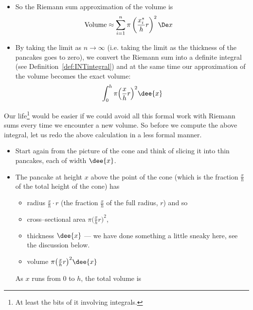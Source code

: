\begin{eg}[Cone]
\begin{itemize}
\item So the Riemann sum approximation of the volume is
\begin{align*}
  \text{Volume} &\approx \sum_{i=1}^n  \pi \left( \frac{x_i^*}{h}r\right)^2 \De x
\end{align*}
\item By taking the limit as $n \to \infty$ (i.e. taking the limit as the thickness of
the pancakes goes to zero), we convert the Riemann sum into a definite integral (see
Definition~\ref{def:INTintegral}) and at the same time our approximation of the volume
becomes the exact volume:
\begin{align*}
\int_0^h \pi \Big(\frac{x}{h}r\Big)^2\dee{x}
\end{align*}
\end{itemize}
Our life\footnote{At least the bits of it involving integrals.} would be easier if
we could avoid all this formal work with Riemann sums every time we encounter a new
volume. So before we compute the above integral, let us redo the above calculation in a
less formal manner.
\begin{itemize}
 \item Start again from the picture of the cone
and think of slicing it into thin pancakes, each of width $\dee{x}$.
\item The pancake at height $x$ above the point of the cone (which is the fraction
$\frac{x}{h}$ of the total height of the cone) has
\begin{itemize}
\item radius $\frac{x}{h}\cdot r$ (the fraction $\frac{x}{h}$ of the
full radius, $r$) and so
\item cross--sectional area $\pi \big(\frac{x}{h}r\big)^2$,
\item thickness $\dee{x}$ --- we have done something a little sneaky here, see the
discussion below.
\item volume $\pi \big(\frac{x}{h}r\big)^2\dee{x}$
\end{itemize}
As $x$ runs from $0$ to $h$, the total volume is

\end{itemize}
\end{eg}
